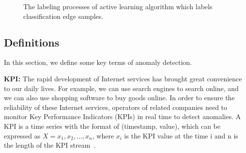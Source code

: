 \begin{figure}
      \vspace{0.3in}
	  \caption{The labeling processes of active learning algorithm which labels classification edge samples.}
	  \label{fig:challenges} 
\end{figure}

\subsection{Definitions}
\label{subsec:kpi}
In this section, we define some key terms of anomaly detection.

\textbf{KPI: }The rapid development of Internet services has brought great convenience to our daily lives. For example, we can use search engines to search online, and we can also use shopping software to buy goods online. In order to ensure the reliability of these Internet services, operators of related companies need to monitor Key Performance Indicators (KPIs) in real time to detect anomalies. A KPI is a time series with the format of (timestamp, value), which can be expressed as $ X = x_1, x_2, \dots, x_n$, where $x_i$ is the KPI value at the time i and n is the length of the KPI  stream~\cite{labelless}.

